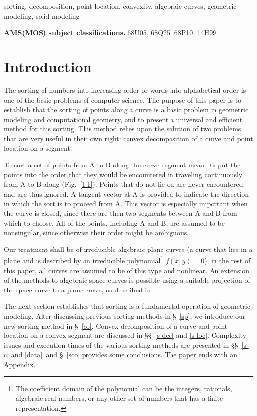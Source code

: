 \begin{keywords}
sorting, decomposition, point location, convexity, algebraic curves,
geometric modeling, solid modeling
\end{keywords}

{\bf AMS(MOS) subject classifications.} 68U05, 68Q25, 68P10, 14H99

\section{Introduction}
%
The sorting of numbers into increasing order or words 
into alphabetical order is one of the basic problems of computer science.  
The purpose of this paper is to establish that the sorting of points
along a curve is a basic problem in geometric modeling and computational geometry,
and to present a universal and efficient method for this sorting.
This method relies upon the solution of two problems that are very useful in their
own right: convex decomposition of a curve and point location on a segment.

To sort a set of points from A to B along the curve segment  means to
put the points into the order that they would be encountered in traveling
continuously from A to B along  (Fig.~\ref{1.1}).
Points that do not lie on  are never encountered and are thus ignored.
A tangent vector at A is provided to indicate the direction in which the sort is to
proceed from A. 
This vector is especially important when the curve is closed, since
there are then two segments between A and B from which to choose.
All of the points, including A and B, are assumed to be nonsingular,
since otherwise their order might be ambiguous.
%

Our treatment shall be of irreducible algebraic plane curves (a curve that 
lies in a plane and is described by an irreducible polynomial\footnote{The coefficient
	domain of the polynomial can be the integers, rationals, algebraic real numbers,
	or any other set of numbers that has a finite representation.}
$f(x,y)=0$); 
in the rest of this paper, all curves are assumed to be of this type and nonlinear.
An extension of the methods to algebraic space curves is possible using 
a suitable projection of the space curve to a plane curve, as described in \cite{jj}.

The next section establishes that sorting is a fundamental operation of 
geometric modeling.
After discussing previous sorting methods in
\S~\ref{sp},
we introduce our new sorting method in
\S~\ref{co}.
Convex decomposition of a curve
and point location on a convex segment 
are discussed in \S\S~\ref{s-dec} 
and \ref{s-loc}.
Complexity issues and execution times of the
various sorting methods are presented in \S\S~\ref{s-c} and 
\ref{data}, and \S~\ref{sco} provides some conclusions.
The paper ends with an Appendix.


